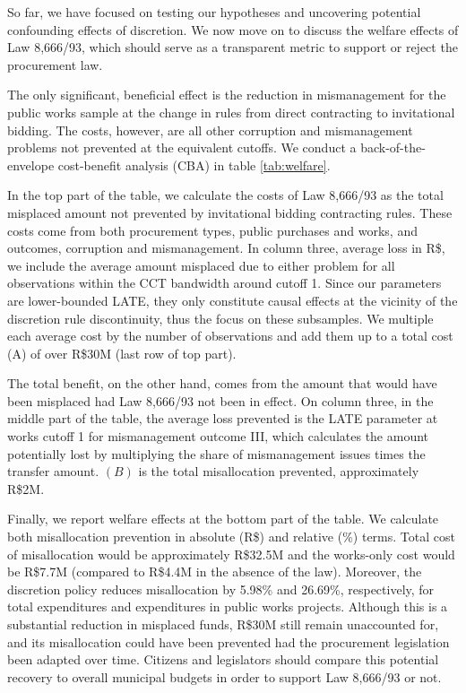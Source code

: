 \documentclass[11pt]{article}
\begin{document}
So far, we have focused on testing our hypotheses and uncovering potential confounding effects of discretion. We now move on to discuss the welfare effects of Law 8,666/93, which should serve as a transparent metric to support or reject the procurement law.

The only significant, beneficial effect is the reduction in mismanagement for the public works sample at the change in rules from direct contracting to invitational bidding. The costs, however, are all other corruption and mismanagement problems not prevented at the equivalent cutoffs. We conduct a back-of-the-envelope cost-benefit analysis (CBA) in table \ref{tab:welfare}.



In the top part of the table, we calculate the costs of Law 8,666/93 as the total misplaced amount not prevented by invitational bidding contracting rules. These costs come from both procurement types, public purchases and works, and outcomes, corruption and mismanagement. In column three, average loss in R\$, we include the average amount misplaced due to either problem for all observations within the CCT bandwidth around cutoff 1. Since our parameters are lower-bounded LATE, they only constitute causal effects at the vicinity of the discretion rule discontinuity, thus the focus on these subsamples. We multiple each average cost by the number of observations and add them up to a total cost (A) of over R\$30M (last row of top part).

The total benefit, on the other hand, comes from the amount that would have been misplaced had Law 8,666/93 not been in effect. On column three, in the middle part of the table, the average loss prevented is the LATE parameter at works cutoff 1 for mismanagement outcome III, which calculates the amount potentially lost by multiplying the share of mismanagement issues times the transfer amount. $(B)$ is the total misallocation prevented, approximately R\$2M.

Finally, we report welfare effects at the bottom part of the table. We calculate both misallocation prevention in absolute (R\$) and relative (\%) terms. Total cost of misallocation would be approximately R\$32.5M and the works-only cost would be R\$7.7M (compared to R\$4.4M in the absence of the law). Moreover, the discretion policy reduces misallocation by 5.98\% and 26.69\%, respectively, for total expenditures and expenditures in public works projects. Although this is a substantial reduction in misplaced funds, R\$30M still remain unaccounted for, and its misallocation could have been prevented had the procurement legislation been adapted over time. Citizens and legislators should compare this potential recovery to overall municipal budgets in order to support Law 8,666/93 or not.
\end{document}
